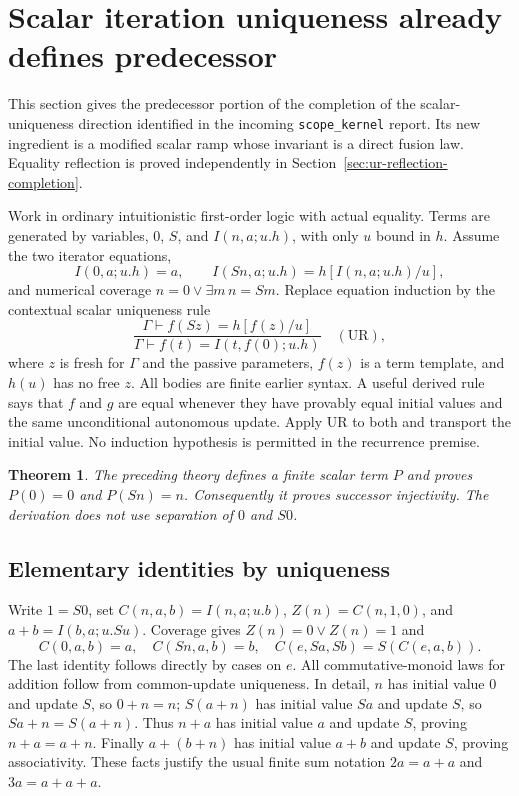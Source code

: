 \documentclass[11pt]{article}
\newtheorem{theorem}{Theorem}[section]
\begin{document}


\section{Scalar iteration uniqueness already defines predecessor}
\label{sec:ur-predecessor}

This section gives the predecessor portion of the completion of the
scalar-uniqueness direction identified in the incoming
\texttt{scope\_kernel} report.  Its new ingredient is a modified scalar
ramp whose invariant is a direct fusion law.  Equality reflection is
proved independently in Section~\ref{sec:ur-reflection-completion}.

Work in ordinary intuitionistic first-order logic with actual equality.
Terms are generated by variables, $0$, $S$, and
$I(n,a;u.h)$, with only $u$ bound in $h$.  Assume the two iterator equations,
\[
 I(0,a;u.h)=a,\qquad I(Sn,a;u.h)=h[I(n,a;u.h)/u],
\]
and numerical coverage $n=0\lor\exists m\,n=Sm$.
Replace equation induction by the contextual scalar uniqueness rule
\[
 \frac{\Gamma\vdash f(Sz)=h[f(z)/u]}
 {\Gamma\vdash f(t)=I(t,f(0);u.h)}\quad(\mathrm{UR}),
\]
where $z$ is fresh for $\Gamma$ and the passive parameters, $f(z)$ is a
term template, and $h(u)$ has no free $z$.  All bodies are finite earlier
syntax.  A useful derived rule says that $f$ and $g$ are equal whenever
they have provably equal initial values and the same unconditional
autonomous update.  Apply UR to both and transport the initial value.
No induction hypothesis is permitted in the recurrence premise.

\begin{theorem}
The preceding theory defines a finite scalar term $P$ and proves
$P(0)=0$ and $P(Sn)=n$.  Consequently it proves successor injectivity.
The derivation does not use separation of $0$ and $S0$.
\end{theorem}

\subsection{Elementary identities by uniqueness}
Write $1=S0$, set $C(n,a,b)=I(n,a;u.b)$, $Z(n)=C(n,1,0)$, and
$a+b=I(b,a;u.Su)$.  Coverage gives $Z(n)=0\lor Z(n)=1$ and
\[
 C(0,a,b)=a,\quad C(Sn,a,b)=b,\quad
 C(e,Sa,Sb)=S(C(e,a,b)).
\]
The last identity follows directly by cases on $e$.
All commutative-monoid laws for addition follow from common-update
uniqueness.  In detail, $n$ has initial value $0$ and update $S$, so
$0+n=n$; $S(a+n)$ has initial value $Sa$ and update $S$, so
$Sa+n=S(a+n)$.  Thus $n+a$ has initial value $a$ and update $S$,
proving $n+a=a+n$.  Finally $a+(b+n)$ has initial value $a+b$ and
update $S$, proving associativity.  These facts justify the usual finite
sum notation $2a=a+a$ and $3a=a+a+a$.
\end{document}
